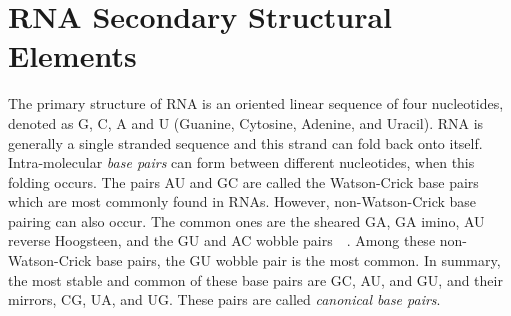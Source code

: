 \documentclass{doublecol-new}
\theoremstyle{TH}{
\newtheorem{lemma}{Lemma}
\newtheorem{theorem}[lemma]{Theorem}
\newtheorem{corrolary}[lemma]{Corrolary}
\newtheorem{conjecture}[lemma]{Conjecture}
\newtheorem{proposition}[lemma]{Proposition}
\newtheorem{claim}[lemma]{Claim}
\newtheorem{stheorem}[lemma]{Wrong Theorem}
\newtheorem{algorithm}{Algorithm}
}
\theoremstyle{THrm}{
\newtheorem{definition}{Definition}
\newtheorem{question}{Question}
\newtheorem{remark}{Remark}
\newtheorem{scheme}{Scheme}
}
\theoremstyle{THhit}{
\newtheorem{case}{Case}[section]
}
\begin{document}
\section{RNA Secondary Structural Elements}

The primary structure of RNA is an oriented linear sequence of
four nucleotides, denoted as G, C, A and U (Guanine, Cytosine, Adenine, and Uracil).
RNA is generally a single stranded sequence and this strand can fold back onto itself.
Intra-molecular {\em base pairs} can form between different nucleotides, when this
folding occurs.
The pairs AU and GC are called the Watson-Crick base pairs which are most commonly
found in RNAs. However, non-Watson-Crick base pairing can also occur. The
common ones are the sheared GA, GA imino, AU reverse Hoogsteen, and the GU and AC
wobble pairs~\cite{LeontisW2001}~\cite{NagaswamyLHCZF2002}.
Among these non-Watson-Crick base pairs, the GU wobble pair is the most common.
In summary, the most stable and common of these base pairs
are GC, AU, and GU, and their mirrors, CG, UA, and UG. These pairs are
called {\em canonical base pairs}.
\end{document}
